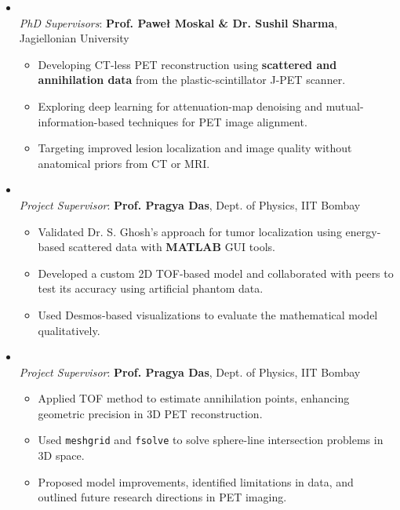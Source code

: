 \noindent {}
\begin{itemize}

\item {} \\
\textit{PhD Supervisors}: \textbf{Prof. Paweł Moskal \& Dr. Sushil Sharma}, Jagiellonian University
    \begin{itemize}
        \item Developing CT-less PET reconstruction using \textbf{scattered and annihilation data} from the plastic-scintillator J-PET scanner.
        \item Exploring deep learning for attenuation-map denoising and mutual-information-based techniques for PET image alignment.
        \item Targeting improved lesion localization and image quality without anatomical priors from CT or MRI.
    \end{itemize}

\item {} \\
\textit{Project Supervisor}: \textbf{Prof. Pragya Das}, Dept. of Physics, IIT Bombay
    \begin{itemize}
    
        \item Validated Dr. S. Ghosh's approach for tumor localization using energy-based scattered data with \textbf{MATLAB} GUI tools.
        
        \item Developed a custom 2D TOF-based model and collaborated with peers to test its accuracy using artificial phantom data.
        
        \item Used Desmos-based visualizations to evaluate the mathematical model qualitatively.
        
    \end{itemize}

\item {} \\
\textit{Project Supervisor}: \textbf{Prof. Pragya Das}, Dept. of Physics, IIT Bombay
    \begin{itemize}
    
        \item Applied TOF method to estimate annihilation points, enhancing geometric precision in 3D PET reconstruction.
        
        \item Used \texttt{meshgrid} and \texttt{fsolve} to solve sphere-line intersection problems in 3D space.
        
        \item Proposed model improvements, identified limitations in data, and outlined future research directions in PET imaging.
        
    \end{itemize}

\end{itemize}